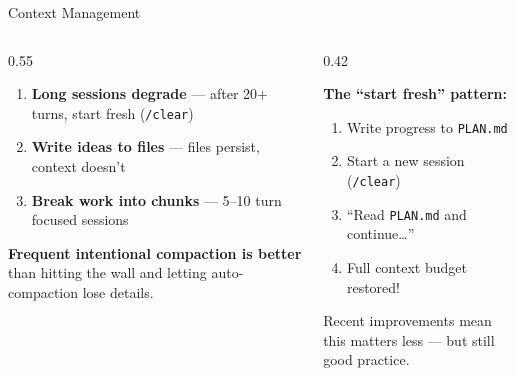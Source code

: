\documentclass[aspectratio=169, 10pt]{beamer}
\begin{document}
\begin{frame}{Context Management}
\begin{columns}[T]
\begin{column}{0.55\textwidth}
\vskip2pt
\begin{enumerate}\setlength{\itemsep}{6pt}
  \item[\color{SlateTeal}\textbf{1.}] \textbf{Long sessions degrade} --- after 20+ turns, start fresh (\texttt{/clear})
  \pause
  \item[\color{SlateTeal}\textbf{2.}] \textbf{Write ideas to files} --- files persist, context doesn't
  \pause
  \item[\color{SlateTeal}\textbf{3.}] \textbf{Break work into chunks} --- 5--10 turn focused sessions
\end{enumerate}
\vskip8pt
\begin{tcolorbox}[quotebox]
\small \textbf{Frequent intentional compaction is better} than hitting the wall and letting auto-compaction lose details.
\end{tcolorbox}
\end{column}
\begin{column}{0.42\textwidth}
\vskip2pt
\begin{tcolorbox}[accentbox]
\small
\textbf{The ``start fresh'' pattern:}
\vskip2pt
\begin{enumerate}\setlength{\itemsep}{0pt}\small
  \item Write progress to \texttt{PLAN.md}
  \item Start a new session (\texttt{/clear})
  \item ``Read \texttt{PLAN.md} and continue\ldots''
  \item Full context budget restored!
\end{enumerate}
\end{tcolorbox}
\vskip4pt
{\scriptsize\color{CoolGray} Recent improvements mean this matters less --- but still good practice.}
\end{column}
\end{columns}\end{frame}
\end{document}
